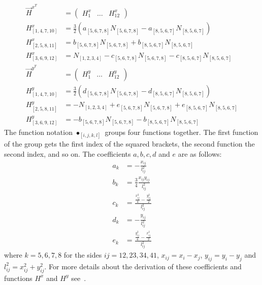   \begin{align}
  \vec{H}^{x^T} &= \begin{pmatrix}
  H_1^x & \dots & H_{12}^x
  \end{pmatrix} \nonumber\\
  H_{\left[1,4,7,10\right]}^x &= \frac{3}{2}\left(a_{\left[5,6,7,8\right]} N_{\left[5,6,7,8\right]} - a_{\left[8,5,6,7\right]} N_{\left[8,5,6,7\right]}\right) \nonumber\\
  H_{\left[2,5,8,11\right]}^x &= b_{\left[5,6,7,8\right]} N_{\left[5,6,7,8\right]} + b_{\left[8,5,6,7\right]} N_{\left[8,5,6,7\right]} \nonumber\\
  H_{\left[3,6,9,12\right]}^x &= N_{\left[1,2,3,4\right]} - c_{\left[5,6,7,8\right]} N_{\left[5,6,7,8\right]} - c_{\left[8,5,6,7\right]} N_{\left[8,5,6,7\right]} \nonumber\\
  \vec{H}^{y^T} &= \begin{pmatrix}
  H_1^y & \dots & H_{12}^y
  \end{pmatrix} \nonumber\\
  H_{\left[1,4,7,10\right]}^y &= \frac{3}{2}\left(d_{\left[5,6,7,8\right]} N_{\left[5,6,7,8\right]} - d_{\left[8,5,6,7\right]} N_{\left[8,5,6,7\right]}\right) \nonumber\\
  H_{\left[2,5,8,11\right]}^y &= -N_{\left[1,2,3,4\right]} + e_{\left[5,6,7,8\right]} N_{\left[5,6,7,8\right]} + e_{\left[8,5,6,7\right]} N_{\left[8,5,6,7\right]} \nonumber\\
  H_{\left[3,6,9,12\right]}^y &= -b_{\left[5,6,7,8\right]} N_{\left[5,6,7,8\right]} - b_{\left[8,5,6,7\right]} N_{\left[8,5,6,7\right]} \nonumber
  \end{align}
  The function notation $\bullet_{\left[i,j,k,l\right]}$ groups four functions together. The first function of the group gets the first index of the squared brackets, the second function the second index, and so on. The coefficients $a,b,c,d$ and $e$ are as follows:
  \begin{align}
  a_k &= -\frac{x_{ij}}{l_{ij}^2} \nonumber\\
  b_k &= \frac{3}{4} \frac{x_{ij} y_{ij}}{l_{ij}^2} \nonumber\\
  c_k &= \frac{ \frac{x_{ij}^2}{4} - \frac{y_{ij}^2}{2} }{l_{ij}^2} \nonumber\\
  d_k &= -\frac{y_{ij}}{l_{ij}^2} \nonumber\\
  e_k &= \frac{ \frac{y_{ij}^2}{4} - \frac{x_{ij}^2}{2} }{l_{ij}^2} \nonumber
  \end{align}
  where $k = 5,6,7,8$ for the sides $ij = 12, 23, 34, 41$, $x_{ij} = x_i - x_j$, $y_{ij} = y_i - y_j$ and $l_{ij}^2 = x_{ij}^2 + y_{ij}^2$. For more details about the derivation of these coefficients and functions $H^x$ and $H^y$ see~\cite{batoz1982evaluation}.
  
